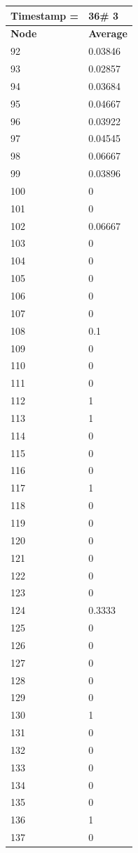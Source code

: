 \begin{tabular}{|l||l|}
\hline
\textbf{Timestamp =} & \textbf{36}\# 3\\\hline
	\textbf{Node} & \textbf{Average} \\ \hline
\hline
	92 & 0.03846 \\ \hline
	93 & 0.02857 \\ \hline
	94 & 0.03684 \\ \hline
	95 & 0.04667 \\ \hline
	96 & 0.03922 \\ \hline
	97 & 0.04545 \\ \hline
	98 & 0.06667 \\ \hline
	99 & 0.03896 \\ \hline
	100 & 0 \\ \hline
	101 & 0 \\ \hline
	102 & 0.06667 \\ \hline
	103 & 0 \\ \hline
	104 & 0 \\ \hline
	105 & 0 \\ \hline
	106 & 0 \\ \hline
	107 & 0 \\ \hline
	108 & 0.1 \\ \hline
	109 & 0 \\ \hline
	110 & 0 \\ \hline
	111 & 0 \\ \hline
	112 & 1 \\ \hline
	113 & 1 \\ \hline
	114 & 0 \\ \hline
	115 & 0 \\ \hline
	116 & 0 \\ \hline
	117 & 1 \\ \hline
	118 & 0 \\ \hline
	119 & 0 \\ \hline
	120 & 0 \\ \hline
	121 & 0 \\ \hline
	122 & 0 \\ \hline
	123 & 0 \\ \hline
	124 & 0.3333 \\ \hline
	125 & 0 \\ \hline
	126 & 0 \\ \hline
	127 & 0 \\ \hline
	128 & 0 \\ \hline
	129 & 0 \\ \hline
	130 & 1 \\ \hline
	131 & 0 \\ \hline
	132 & 0 \\ \hline
	133 & 0 \\ \hline
	134 & 0 \\ \hline
	135 & 0 \\ \hline
	136 & 1 \\ \hline
	137 & 0 \\ \hline
\end{tabular}

